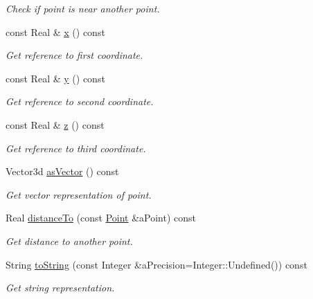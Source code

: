 \begin{DoxyCompactItemize}
\begin{DoxyCompactList}\small\item\em Check if point is near another point. \end{DoxyCompactList}\item 
const Real \& \hyperlink{classlibrary_1_1math_1_1geom_1_1d3_1_1objects_1_1_point_a6a850887daa11135e062026b146eb1e9}{x} () const
\begin{DoxyCompactList}\small\item\em Get reference to first coordinate. \end{DoxyCompactList}\item 
const Real \& \hyperlink{classlibrary_1_1math_1_1geom_1_1d3_1_1objects_1_1_point_a6e2590786e8261728b5b230823c2784d}{y} () const
\begin{DoxyCompactList}\small\item\em Get reference to second coordinate. \end{DoxyCompactList}\item 
const Real \& \hyperlink{classlibrary_1_1math_1_1geom_1_1d3_1_1objects_1_1_point_a4e121b68d1eb71be9adc575e7149c47e}{z} () const
\begin{DoxyCompactList}\small\item\em Get reference to third coordinate. \end{DoxyCompactList}\item 
Vector3d \hyperlink{classlibrary_1_1math_1_1geom_1_1d3_1_1objects_1_1_point_ac0fada0a034f3104675c713b329a97eb}{as\+Vector} () const
\begin{DoxyCompactList}\small\item\em Get vector representation of point. \end{DoxyCompactList}\item 
Real \hyperlink{classlibrary_1_1math_1_1geom_1_1d3_1_1objects_1_1_point_a0108b685599f2684837d2898250c5a36}{distance\+To} (const \hyperlink{classlibrary_1_1math_1_1geom_1_1d3_1_1objects_1_1_point}{Point} \&a\+Point) const
\begin{DoxyCompactList}\small\item\em Get distance to another point. \end{DoxyCompactList}\item 
String \hyperlink{classlibrary_1_1math_1_1geom_1_1d3_1_1objects_1_1_point_ade65de7e80d3cd47a7cbe75e9a5daa8f}{to\+String} (const Integer \&a\+Precision=Integer\+::\+Undefined()) const
\begin{DoxyCompactList}\small\item\em Get string representation. \end{DoxyCompactList}\item 

\end{DoxyCompactItemize}

